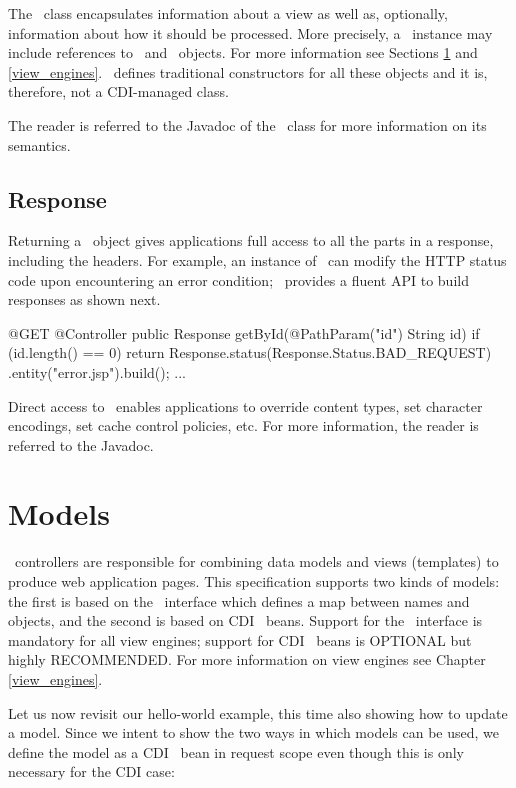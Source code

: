 The \Viewable\ class encapsulates information about a view as well as, optionally, information 
about how it  should be processed. More precisely, a \Viewable\ instance may include references 
to \Models\ and \ViewEngine\ objects. For more information see Sections \ref{models} and \ref{view_engines}. 
\Viewable\ defines traditional constructors for all these objects and it is, therefore, not a 
CDI-managed class.

The reader is referred to the Javadoc of the \Viewable\ class for more information on its semantics.

\subsection{Response}
\label{response}

Returning a \Response\ object gives applications full access to all the parts in a response, 
including the headers. For example, an instance of  \Response\ can modify the HTTP status
code upon encountering an error condition; \jaxrs\ provides a fluent API to build responses
as shown next.

\begin{listing}{1}
@GET
@Controller
public Response getById(@PathParam("id") String id) {
    if (id.length() == 0) {
   	    return Response.status(Response.Status.BAD_REQUEST)
   	                   .entity("error.jsp").build();
    } 
    ...
}
\end{listing}

Direct access to \Response\ enables applications to override content types, set character
encodings, set cache control policies, etc. For more information, the reader is referred to the
Javadoc.

\section{Models}
\label{models}

\mvc\ controllers are responsible for combining data models and views (templates) to 
produce web application pages. This specification supports two kinds of models: the
first is based on the \Models\ interface which defines a map between names and
objects, and the second is based on CDI \Named\ beans. Support for the \Models\ 
interface is mandatory for all view engines; support for CDI \Named\ beans is
OPTIONAL but highly RECOMMENDED. For more information on view engines see
Chapter \ref{view_engines}.

Let us now revisit our hello-world example, this time also showing how to update
a model. Since we intent to show the two ways in which models can be used, we define the
model as a CDI \Named\ bean in request scope even though this is only necessary
for the CDI case:

